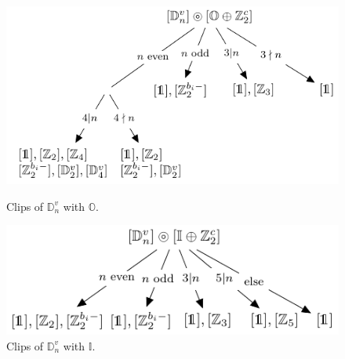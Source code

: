 \documentclass[11pt,a4paper]{amsart}
\theoremstyle{definition}
\newcommand{\octa}{\mathbb{O}}              %
\newcommand{\ico}{\mathbb{I}}               %
\newcommand{\DD}{\mathbb{D}}                %
\newcommand{\1}{\mathds{1}}		            %
\begin{document}
\begin{figure}[h!]
	\begin{minipage}[b]{0.5\linewidth}
		\centering \includegraphics[width=0.9\linewidth]{"Figures piezo/graphe9'"}
		\caption{Clips of $\DD_n^v$ with $\octa$.}
		\label{fig:graphe9}
	\end{minipage}\hfill
	\begin{minipage}[b]{0.5\linewidth}
		\centering \includegraphics[width=0.9\linewidth]{"Figures piezo/graphe10'"}
		\caption{Clips of $\DD_n^v$ with $\ico$.}
		\label{fig:graphe10}
	\end{minipage}
\end{figure}
\end{document}
